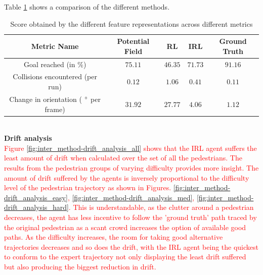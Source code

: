 
Table \ref{tab:inter_method_numerical_results} shows a comparison of the different methods.
\begin{table}[htbp]
	\begin{center}
		\renewcommand{\arraystretch}{1.3}
		\begin{tabular}{|c|c|c|c|c|}
			\hline
			Metric Name & Potential Field & RL & IRL  &  Ground Truth \\
			\hline
			Goal reached (in $\%$) & $75.11$ & $46.35$ & $71.73$ & $91.16$\\
			Collisions encountered (per run) & $ 0.12$ & $1.06$ & $0.41$ & $0.11$\\
			Change in orientation ( $\degree$ per frame) & $31.92$ & $27.77$ &  $4.06$ & $1.12$ \\
			\hline
		\end{tabular}
	\end{center}
	\caption{Score obtained by the different feature representations across different metrics}
	\label{tab:inter_method_numerical_results}
\end{table}\\
\textbf{Drift analysis}\\
\textcolor{red}{Figure \ref{fig:inter_method-drift_analysis_all} shows that the IRL agent suffers the least amount of drift when calculated over the set of all the pedestrians. The results from the pedestrian groups of varying difficulty provides more insight. The amount of drift suffered by the agents is inversely proportional to the difficulty level of the pedestrian trajectory as shown in Figures. \ref{fig:inter_method-drift_analysis_easy}, \ref{fig:inter_method-drift_analysis_med}, \ref{fig:inter_method-drift_analysis_hard}. This is understandable, as the clutter around a pedestrian decreases, the agent has less incentive to follow the 'ground truth' path traced by the original pedestrian as a scant crowd increases the option of available good paths. As the difficulty increases, the room for taking good alternative trajectories decreases and so does the drift, with the IRL agent being the quickest to conform to the expert trajectory not only displaying the least drift suffered but also producing the biggest reduction in drift.}\\

